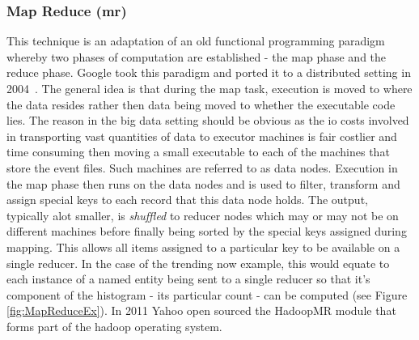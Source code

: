 \documentclass[a4paper,11pt]{scrreprt}
\begin{document}
\subsubsection{Map Reduce (\acrshort{mr})}
This technique is an adaptation of an old functional programming paradigm whereby two phases of computation are established - the map phase and the reduce phase. Google took this paradigm and ported it to a distributed setting in 2004~\cite{mapreduce}. The general idea is that during the map task, execution is moved to where the data resides rather then data being moved to whether the executable code lies. The reason in the big data setting should be obvious as the \acrshort{io} costs involved in transporting vast quantities of data to executor machines is fair costlier and time consuming then moving a small executable to each of the machines that store the event files. Such machines are referred to as data nodes. Execution in the map phase then runs on the data nodes and is used to filter, transform and assign special keys to each record that this data node holds. The output, typically alot smaller, is \textit{shuffled} to reducer nodes which may or may not be on different machines before finally being sorted by the special keys assigned during mapping. This allows all items assigned to a particular key to be available on a single reducer. In the case of the trending now example, this would equate to each instance of a named entity being sent to a single reducer so that it's component of the histogram - its particular count - can be computed (see Figure \ref{fig:MapReduceEx}). In 2011 Yahoo open sourced the HadoopMR\autocite{hadoopMR} module that forms part of the hadoop operating system.\\
\end{document}
